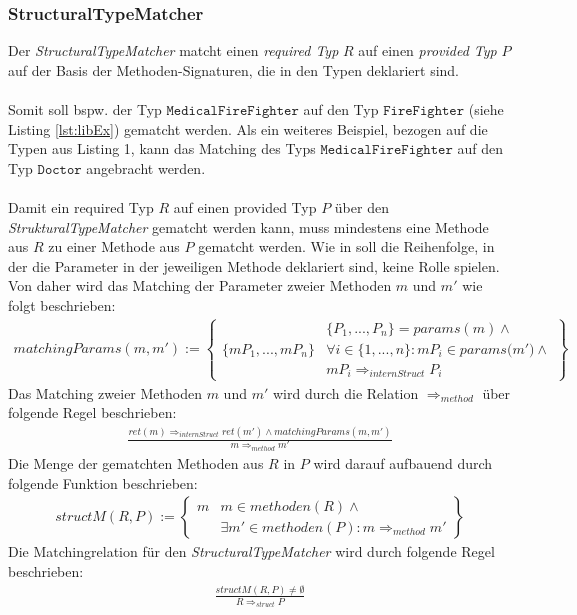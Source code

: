 \subsubsection{StructuralTypeMatcher} 
Der \emph{StructuralTypeMatcher} matcht einen \emph{required Typ} $R$ auf einen \emph{provided Typ} $P$ auf der Basis der Methoden-Signaturen, die in den Typen deklariert sind.
\\\\
Somit soll bspw. der Typ $\texttt{MedicalFireFighter}$ auf den Typ $\texttt{FireFighter}$ (siehe Listing \ref{lst:libEx}) gematcht werden. Als ein weiteres Beispiel, bezogen auf die Typen aus Listing 1, kann das Matching des Typs $\texttt{MedicalFireFighter}$ auf den Typ $\texttt{Doctor}$ angebracht werden.
\\\\
Damit ein required Typ $R$ auf einen provided Typ $P$ über den \emph{StrukturalTypeMatcher} gematcht werden kann, muss mindestens eine Methode aus $R$ zu einer Methode aus $P$ gematcht werden. Wie in \cite{moormann} soll die Reihenfolge, in der die Parameter in der jeweiligen Methode deklariert sind, keine Rolle spielen. Von daher wird das Matching der Parameter zweier Methoden $m$ und $m'$ wie folgt beschrieben:
\begin{gather*}
\mathit{matchingParams(m, m')} :=
\left\{
\begin{array}{l|l}
	&
	\{\mathit{P_1,...,P_n}\} = \mathit{params(m)} \wedge \mathit{ }
	\\
	\{\mathit{mP_1,...,mP_n}\}
	&
	\forall i \in \{1,...,n\}: \mathit{mP_i} \in \mathit{params(m'}) \wedge \mathit{ }
	\\
	&
	\mathit{mP_i} \Rightarrow_{internStruct} \mathit{P_i}
\end{array}
\right\}
\end{gather*}
\noindent
Das Matching zweier Methoden $m$ und $m'$ wird durch die Relation $\Rightarrow_{method}$ über folgende Regel beschrieben:
\begin{gather*}
\frac{\mathit{ret(m)} \Rightarrow_{internStruct} \mathit{ret(m')} \wedge \mathit{matchingParams(m,m')}}{m \Rightarrow_{method} m'}
\end{gather*}
\noindent
Die Menge der gematchten Methoden aus $R$ in $P$ wird darauf aufbauend durch folgende Funktion beschrieben:
\begin{gather*}
structM(R,P) := \left\{ 
				\begin{array}{l|l}
m	& \mathit{m} \in \mathit{methoden(R)} \wedge \mathit{ }
\\
	& \exists \mathit{m'} \in \mathit{methoden(P)} : m \Rightarrow_{method} m'
				\end{array}
              \right\}
\end{gather*}
\noindent
Die Matchingrelation für den \emph{StructuralTypeMatcher} wird durch folgende Regel beschrieben:
\begin{gather*}
\frac{structM(R,P) \neq \emptyset}{R \Rightarrow_{struct}P}
\end{gather*}


